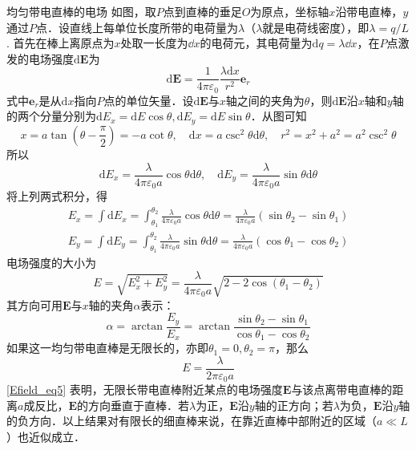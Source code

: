 \begin{example}{均匀带电直棒的电场}
如图，取$P$点到直棒的垂足$O$为原点，坐标轴$x$沿带电直棒，$y$通过$P$点．设直线上每单位长度所带的电荷量为$\lambda$（$\lambda$就是电荷线密度），即$\lambda=q/L$. 首先在棒上离原点为$x$处取一长度为$\dd{x}$的电荷元，其电荷量为$\mathrm dq=\lambda\dd{x}$，在$P$点激发的电场强度$\mathrm d\mathbf E$为
\begin{equation}
\mathrm{d} \mathbf{E}=\frac{1}{4 \pi \varepsilon_{0}} \frac{\lambda \mathrm{d} x}{r^{2}} \mathbf e_r
\end{equation}
式中$\mathbf e_r$是从$\mathrm dx$指向$P$点的单位矢量．设$\mathrm{d} \mathbf{E}$与$x$轴之间的夹角为$\theta$，则$\mathrm{d} \mathbf{E}$沿$x$轴和$y$轴的两个分量分别为$\mathrm{d} E_{x}=\mathrm{d} E \cos \theta, \mathrm{d} E_{y}=\mathrm{d} E \sin \theta$．从图可知
\begin{equation}
x=a \tan \left(\theta-\frac{\pi}{2}\right)=-a \cot \theta, \quad \mathrm{d} x=a \csc ^{2} \theta \mathrm{d} \theta, \quad r^{2}=x^{2}+a^{2}=a^{2} \csc ^{2} \theta
\end{equation}
所以
\begin{equation}
\mathrm{d} E_{x}=\frac{\lambda}{4 \pi \varepsilon_{0} a} \cos \theta \mathrm{d} \theta, \quad \mathrm{d} E_{y}=\frac{\lambda}{4 \pi \varepsilon_{0} a} \sin \theta \mathrm{d} \theta
\end{equation}
将上列两式积分，得
\begin{equation}
\begin{aligned}E_{x}=\int \mathrm{d} E_{x}=\int_{\theta_{1}}^{\theta_{2}} \frac{\lambda}{4 \pi \varepsilon_{0} a} \cos \theta \mathrm{d} \theta=\frac{\lambda}{4 \pi \varepsilon_{0} a}\left(\sin \theta_{2}-\sin \theta_{1}\right) \\ E_{y}=\int \mathrm{d} E_{y}=\int_{\theta_{1}}^{\theta_{2}} \frac{\lambda}{4 \pi \varepsilon_{0} a} \sin \theta \mathrm{d} \theta=\frac{\lambda}{4 \pi \varepsilon_{0} a}\left(\cos \theta_{1}-\cos \theta_{2}\right)\end{aligned}
\end{equation}
电场强度的大小为
\begin{equation}
E=\sqrt{E_{x}^{2}+E_{y}^{2}}=\frac{\lambda}{4 \pi \varepsilon_{0} a} \sqrt{2-2 \cos \left(\theta_{1}-\theta_{2}\right)}
\end{equation}
其方向可用$\mathbf E$与$x$轴的夹角$\alpha$表示：
\begin{equation}
\alpha=\arctan \frac{E_{y}}{E_{x}}=\arctan \frac{\sin \theta_{2}-\sin \theta_{1}}{\cos \theta_{1}-\cos \theta_{2}}
\end{equation}
如果这一均匀带电直棒是无限长的，亦即$\theta_{1}=0, \theta_{2}=\pi$，那么
\begin{equation} \label{Efield_eq5}
E=\frac{\lambda}{2 \pi \varepsilon_{0} a}
\end{equation}
\autoref{Efield_eq5} 表明，无限长带电直棒附近某点的电场强度$\mathbf E$与该点离带电直棒的距离$a$成反比，$\mathbf  E$的方向垂直于直棒．若$\lambda$为正，$\mathbf E$沿$y$轴的正方向；若$\lambda$为负，$\mathbf E$沿$y$轴的负方向．以上结果对有限长的细直棒来说，在靠近直棒中部附近的区域（$a\ll L$）也近似成立．
\end{example}


